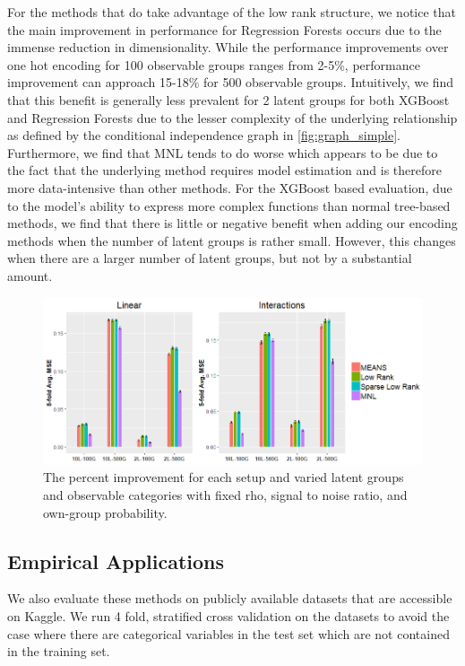\documentclass{article}
\theoremstyle{plain}
\theoremstyle{definition}
\theoremstyle{remark}
\begin{document}
For the methods that do take advantage of the low rank structure, we notice that the main improvement in performance for Regression Forests occurs due to the immense reduction in dimensionality. While the performance improvements over one hot encoding for 100 observable groups ranges from 2-5\%, performance improvement can approach 15-18\% for 500 observable groups. Intuitively, we find that this benefit is generally less prevalent for 2 latent groups for both XGBoost and Regression Forests due to the lesser complexity of the underlying relationship as defined by the conditional independence graph in \ref{fig:graph_simple}. Furthermore, we find that MNL tends to do worse which appears to be due to the fact that the underlying method requires model estimation and is therefore more data-intensive than other methods. For the XGBoost based evaluation, due to the model's ability to express more complex functions than normal tree-based methods, we find that there is little or negative benefit when adding our encoding methods when the number of latent groups is rather small. However, this changes when there are a larger number of latent groups, but not by a substantial amount.

\begin{figure}[htp]
  \centering
  \includegraphics[scale=0.6]{figures/rf_simulation_results_with_196se.png}
  \caption {The percent improvement for each setup and varied latent groups and observable categories with fixed rho, signal to noise ratio, and own-group probability.}
  \label{tab:rf_sim_setups}
\end{figure}



\subsection{Empirical Applications}
\label{sec:empirical_applications}

We also evaluate these methods on publicly available datasets that are accessible on Kaggle. We run 4 fold, stratified cross validation on the datasets to avoid the case where there are categorical variables in the test set which are not contained in the training set.
\end{document}
